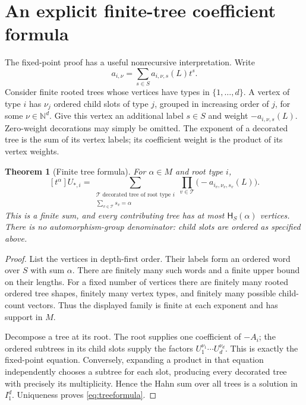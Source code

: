 \documentclass[11pt,a4paper]{article}
\newtheorem{theorem}{Theorem}[section]
\theoremstyle{definition}
\theoremstyle{remark}
\newcommand{\N}{\mathbb N}
\newcommand{\depth}{\mathsf H}
\newcommand{\coef}[1]{\left[#1\right]}
\begin{document}
\section{An explicit finite-tree coefficient formula}
\label{sec:trees}

The fixed-point proof has a useful nonrecursive interpretation. Write
\[
 a_{i,\nu}=\sum_{s\in S}a_{i,\nu,s}(L)t^s.
\]
Consider finite rooted trees whose vertices have types in
$\{1,\ldots,d\}$. A vertex of type $i$ has $\nu_j$ ordered child slots of
type $j$, grouped in increasing order of $j$, for some $\nu\in\N^d$.
Give this vertex an additional label $s\in S$ and weight
$-a_{i,\nu,s}(L)$. Zero-weight decorations may simply be omitted.
The exponent of a decorated tree is the sum of its vertex labels; its
coefficient weight is the product of its vertex weights.

\begin{theorem}[Finite tree formula]\label{thm:trees}
For $\alpha\in M$ and root type $i$,
\begin{equation}\label{eq:treeformula}
 \coef{t^\alpha}U_{*,i}
 =\sum_{\substack{\mathcal T\text{ decorated tree of root type }i\\
                    \sum_{v\in\mathcal T}s_v=\alpha}}
       \prod_{v\in\mathcal T}\bigl(-a_{i_v,\nu_v,s_v}(L)\bigr).
\end{equation}
This is a finite sum, and every contributing tree has at most
$\depth_S(\alpha)$ vertices. There is no automorphism-group denominator:
child slots are ordered as specified above.
\end{theorem}
\begin{proof}
List the vertices in depth-first order. Their labels form an ordered word
over $S$ with sum $\alpha$. There are finitely many such words and a finite
upper bound on their lengths. For a fixed number of vertices there are
finitely many rooted ordered tree shapes, finitely many vertex types, and
finitely many possible child-count vectors. Thus the displayed family is
finite at each exponent and has support in $M$.

Decompose a tree at its root. The root supplies one coefficient of $-A_i$;
the ordered subtrees in its child slots supply the factors
$U_1^{\nu_1}\cdots U_d^{\nu_d}$. This is exactly the fixed-point equation.
Conversely, expanding a product in that equation independently chooses a
subtree for each slot, producing every decorated tree with precisely its
multiplicity. Hence the Hahn sum over all trees is a solution in $I_1^d$.
Uniqueness proves \eqref{eq:treeformula}.
\end{proof}
\end{document}

